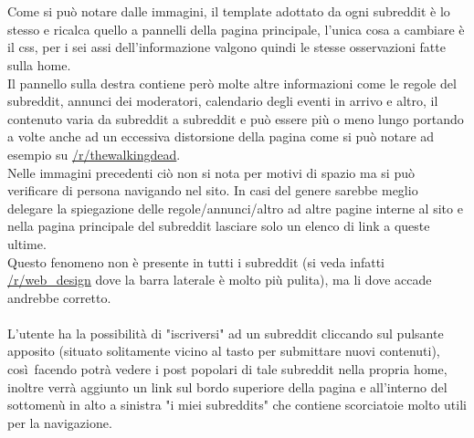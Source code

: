 \documentclass[12pt]{article}
\begin{document}
\\ \\
Come si pu\`o notare dalle immagini, il template adottato da ogni subreddit \`e lo stesso e ricalca quello a pannelli della pagina principale, l'unica cosa a cambiare \`e il css, per i sei assi dell'informazione valgono quindi le stesse osservazioni fatte sulla home. \\Il pannello sulla destra contiene per\`o molte altre informazioni come le regole del subreddit, annunci dei moderatori, calendario degli eventi in arrivo e altro, il contenuto varia da subreddit a subreddit e pu\`o essere pi\`u o meno lungo portando a volte anche ad un eccessiva distorsione della pagina come si pu\`o notare ad esempio su \href{www.reddit.com/r/thewalkingdead}{/r/thewalkingdead}.\\ Nelle immagini precedenti ci\`o non si nota per motivi di spazio ma si pu\`o verificare di persona navigando nel sito. In casi del genere sarebbe meglio delegare la spiegazione delle regole/annunci/altro ad altre pagine interne al sito e nella pagina principale del subreddit lasciare solo un elenco di link a queste ultime. \\Questo fenomeno non \`e presente in tutti i subreddit (si veda infatti \href{www.reddit.com/r/web_design}{/r/web\_design} dove la barra laterale \`e molto pi\`u pulita), ma li dove accade andrebbe corretto. \\ \\L'utente ha la possibilit\`a di "iscriversi" ad un subreddit cliccando sul pulsante apposito (situato solitamente vicino al tasto per submittare nuovi contenuti), cos\`i\  facendo potr\`a vedere i post popolari di tale subreddit nella propria home, inoltre verr\`a aggiunto un link sul bordo superiore della pagina e all'interno del sottomen\`u in alto a sinistra "i miei subreddits" che contiene scorciatoie molto utili per la navigazione.
\newpage
\end{document}
